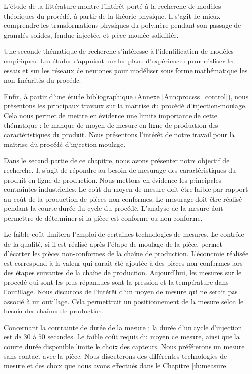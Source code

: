 L'étude de la littérature montre l'intérêt porté à la recherche de modèles théoriques du procédé, à partir de la théorie physique.
Il s'agit de mieux comprendre les transformations physiques du polymère pendant son passage de granulés solides, fondue injectée, et pièce moulée solidifiée.

Une seconde thématique de recherche s'intéresse à l'identification de modèles empiriques.
Les études s'appuient sur les plans d'expériences pour réaliser les essais et sur les réseaux de neurones pour modéliser sous forme mathématique les non-linéarités du procédé.

Enfin, à partir d'une étude bibliographique (Annexe \ref{Ann:process_control}), nous présentons les principaux travaux sur la maîtrise du procédé d'injection-moulage.
Cela nous permet de mettre en évidence une limite importante de cette thématique : le manque de moyen de mesure en ligne de production des caractéristiques du produit.
Nous présentons l'intérêt de notre travail pour la maîtrise du procédé d'injection-moulage.

\smallskip

Dans le second partie de ce chapitre, nous avons présenter notre objectif de recherche.
Il s'agit de répondre au besoin de mesurage des caractéristiques du produit en ligne de production.
Nous mettons en évidence les principales contraintes industrielles.
Le coût du moyen de mesure doit être faible par rapport au coût de la production de pièces non-conformes.
Le mesurage doit être réalisé pendant la courte durée du cycle du procédé.
L'analyse de la mesure doit permettre de déterminer si la pièce est conforme ou non-conforme.

Le faible coût limitera l'emploi de certaines technologies de mesures.
Le contrôle de la qualité, si il est réalisé après l'étape de moulage de la pièce, permet d'écarter les pièces non-conformes de la chaîne de production.
L'économie réalisée est correspond à la valeur qui aurait été ajoutée à des pièces non-conformes lors des étapes suivantes de la chaîne de production.
Aujourd'hui, les mesures sur le procédé qui sont les plus répandues sont la pression et la température dans l'outillage.
Nous discutons de l'intérêt d'un moyen de mesure qui ne serait pas associé à un outillage.
Cela permettrait un positionnement de la mesure selon le besoin des chaînes de production.

Concernant la contrainte de durée de la mesure ; la durée d'un cycle d'injection est de 30 à 60 secondes.
Le faible coût requis du moyen de mesure, ainsi que la courte durée disponible limite le choix des capteurs.
Nous préférerons un mesure sans contact avec la pièce.
Nous discuterons des différentes technologies de mesure et des choix que nous avons effectués dans le Chapitre \ref{ch:measure}.

